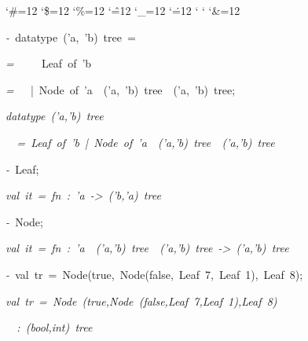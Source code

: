 \begin{list}{}
{\setlength{\leftmargin}{\leftmargini}
\setlength{\rightmargin}{0cm}
\setlength{\itemindent}{0cm}
\setlength{\listparindent}{0cm}
\setlength{\itemsep}{0cm}
\setlength{\parsep}{0cm}
\setlength{\labelsep}{0cm}
\setlength{\labelwidth}{0cm}
\catcode`\#=12
\catcode`\$=12
\catcode`\%=12
\catcode`\^=12
\catcode`\_=12
\catcode`\.=12
\catcode`
\catcode`
\catcode`\&=12
\ttfamily}
\small
\item[]\textsl{-\ }datatype\ ('a,\ 'b)\ tree\ =
\item[]\textsl{=\ }\ \ \ \ Leaf\ of\ 'b
\item[]\textsl{=\ }\ \ |\ Node\ of\ 'a\ \ ('a,\ 'b)\ tree\ \ ('a,\ 'b)\ tree;
\item[]\textsl{datatype\ ('a,'b)\ tree}
\item[]\textsl{\ \ =\ Leaf\ of\ 'b\ |\ Node\ of\ 'a\ \ ('a,'b)\ tree\ \ ('a,'b)\ tree}
\item[]\textsl{-\ }Leaf;
\item[]\textsl{val\ it\ =\ fn\ :\ 'a\ ->\ ('b,'a)\ tree}
\item[]\textsl{-\ }Node;
\item[]\textsl{val\ it\ =\ fn\ :\ 'a\ \ ('a,'b)\ tree\ \ ('a,'b)\ tree\ ->\ ('a,'b)\ tree}
\item[]\textsl{-\ }val\ tr\ =\ Node(true,\ Node(false,\ Leaf\ 7,\ Leaf\ 1),\ Leaf\ 8);
\item[]\textsl{val\ tr\ =\ Node\ (true,Node\ (false,Leaf\ 7,Leaf\ 1),Leaf\ 8)}
\item[]\textsl{\ \ :\ (bool,int)\ tree}
\end{list}
